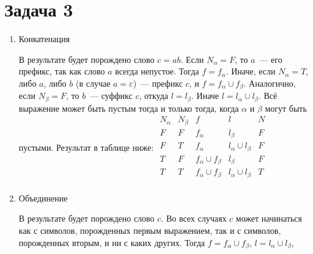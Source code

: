\documentclass[a4paper]{article}
\begin{document}
\section*{Задача 3}
\begin{enumerate}
\item{Конкатенация}\newline
{}
\newline
В результате будет порождено слово $c=ab$.\newline
Если $N_\alpha=F$, то $a$~--- его префикс, так как слово $a$ всегда непустое. Тогда $f=f_\alpha$. Иначе, если $N_\alpha=T$, либо $a$, либо $b$ (в случае $a=\varepsilon$)~--- префикс $c$, и $f=f_\alpha\cup f_\beta$. Аналогично, если $N_\beta=F$, то $b$~--- суффикс $c$, откуда $l=l_\beta$. Иначе $l=l_\alpha\cup l_\beta$.\newline
Всё выражение может быть пустым тогда и только тогда, когда $\alpha$ и $\beta$ могут быть пустыми. Результат в таблице ниже:\newline
$
\begin{array}{ccccc}
N_\alpha & N_\beta & f & l & N\\
F & F & f_\alpha & l_\beta & F \\
F & T & f_\alpha & l_\alpha \cup l_\beta & F\\
T & F & f_\alpha \cup f_\beta & l_\beta & F\\
T & T & f_\alpha \cup f_\beta & l_\alpha \cup l_\beta & T\\
\end{array}
$
\item{Объединение}\newline
{}
\newline
В результате будет порождено слово $c$.\newline
Во всех случаях $c$ может начинаться как с символов, порожденных первым выражением, так и с символов, порожденных вторым, и ни с каких других. Тогда $f=f_\alpha\cup f_\beta$, $l=l_\alpha\cup l_\beta$,

\end{enumerate}
\end{document}
